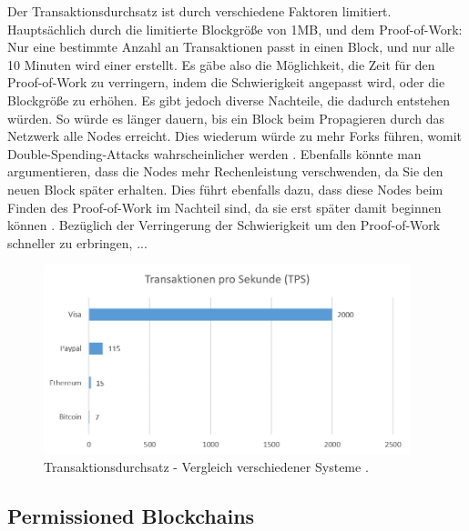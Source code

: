 Der Transaktionsdurchsatz ist durch verschiedene Faktoren limitiert. Hauptsächlich durch die limitierte Blockgröße von 1MB, und dem Proof-of-Work: Nur eine bestimmte Anzahl an Transaktionen passt in einen Block, und nur alle 10 Minuten wird einer erstellt. Es gäbe also die Möglichkeit, die Zeit für den Proof-of-Work zu verringern, indem die Schwierigkeit angepasst wird, oder die Blockgröße zu erhöhen. Es gibt jedoch diverse Nachteile, die dadurch entstehen würden. So würde es länger dauern, bis ein Block beim Propagieren durch das Netzwerk alle Nodes erreicht. Dies wiederum würde zu mehr Forks führen, womit Double-Spending-Attacks wahrscheinlicher werden \cite{SchererPerformanceScalabilityBlockchain2017}.   Ebenfalls könnte man argumentieren, dass die Nodes mehr Rechenleistung verschwenden, da Sie den neuen Block später erhalten. Dies führt ebenfalls dazu, dass diese Nodes beim Finden des Proof-of-Work im Nachteil sind, da sie erst später damit beginnen können \cite{BitcoinWikiBlocksizelimit}. Bezüglich der Verringerung der Schwierigkeit um den Proof-of-Work schneller zu erbringen, ...





\begin{figure}[htb]
    \centering
      \includegraphics[width=0.95\textwidth,angle=0]{images/tps-comparison}
       \caption{Transaktionsdurchsatz - Vergleich verschiedener Systeme \cite{ScalabilityBitcoinWiki}.}
      \label{fig:tps-comparison}
\end{figure}          



\subsection{Permissioned Blockchains}

